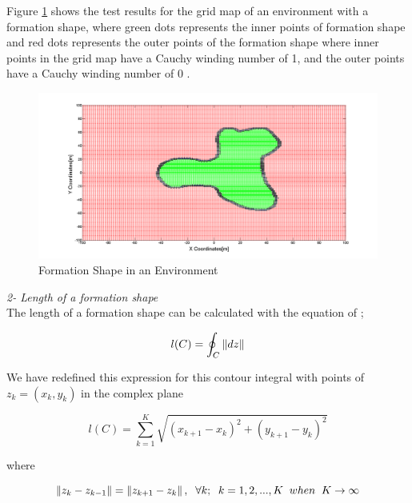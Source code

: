 Figure \ref{iceride_disarida_refe} shows the test results for the grid map of an environment with a formation shape, where green dots represents the inner points of formation shape and red dots represents the outer points of the formation shape where inner points in the grid map have a Cauchy winding number of 1, and the outer points have a Cauchy winding number of 0 .

\begin{figure}[H]
\centering
\captionsetup{format=hang,justification=centerfirst}
\caption{Formation Shape in an Environment} \label{iceride_disarida_refe}
\includegraphics[scale = 0.28]{iceride_disarida}
\end{figure}

\textit{ 	2- Length of a formation shape} \\ 
The length of a formation shape can be calculated with the equation of \cite{17};
		
\begin{equation}
l(C)= \oint_C \left\lVert dz\right\rVert
\end{equation}
		
We have redefined this expression for this contour integral with points of   $z_k = (x_k,y_k)$ in the complex plane

\begin{equation}
l(C) = \sum_{k=1}^{K}\sqrt{(x_{k+1} - x_k)^2 + (y_{k+1} - y_k)^2}
\end{equation}

where

\begin{equation}
\left\lVert z_k - z_{k-1}\right\rVert = \left\lVert z_{k+1} - z_k\right\rVert, \hspace{0.2cm}  \forall k ;  \hspace{0.2cm} k=1,2,...,K \hspace{0.2cm} when  \hspace{0.2cm} K \to\infty
\end{equation}
		
